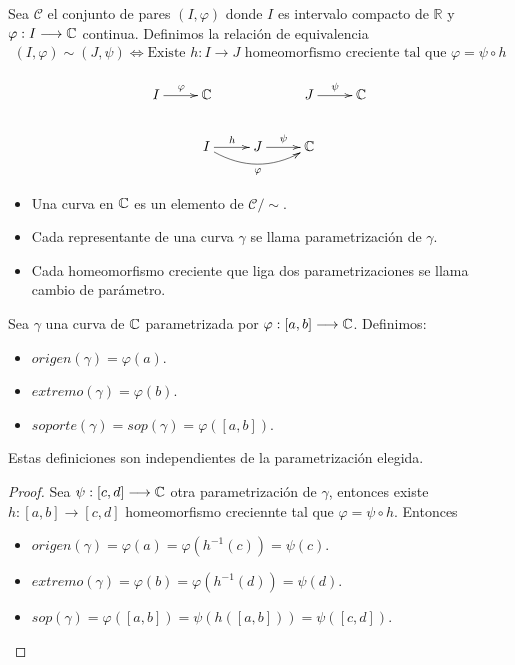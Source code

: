 Sea $\mathcal{C}$ el conjunto de pares $(I,\varphi)$ donde $I$ es intervalo compacto de $\mathbb{R}$ y $\varphi : I \longrightarrow \mathbb{C}$ continua. Definimos la relación de equivalencia
\begin{align*}
    (I,\varphi) \sim (J,\psi) \Longleftrightarrow\text{Existe } h: I \longrightarrow J \text{ homeomorfismo creciente tal que } \varphi = \psi \circ h
\end{align*}

\begin{align*}
    \xymatrix{
    I \ar[r]^{\varphi} & \com                                  &                 & J \ar[r]^{\psi} & \com \\
                       & I \ar[r]^{h} \ar@/_1pc/[rr]_{\varphi} & J \ar[r]^{\psi} & \com
    }
\end{align*}

\begin{defi}
    \begin{itemize}
        \item Una curva en $\mathbb{C}$ es un elemento de $\mathcal{C}/\sim$.
        \item Cada representante de una curva $\gamma$ se llama parametrización de $\gamma$.
        \item Cada homeomorfismo creciente que liga dos parametrizaciones se llama cambio de parámetro.
    \end{itemize}
\end{defi}

\begin{defi}
    Sea $\gamma$ una curva de $\mathbb{C}$ parametrizada por $\varphi : [a,b] \longrightarrow \mathbb{C}$. Definimos:
    \begin{itemize}
        \item $origen(\gamma) = \varphi(a)$.
        \item $extremo(\gamma) = \varphi(b)$.
        \item $soporte(\gamma) = sop(\gamma) = \varphi([a,b])$.
    \end{itemize}
\end{defi}

\begin{obs}
    Estas definiciones son independientes de la parametrización elegida.
    \begin{proof}
        Sea $\psi : [c,d] \longrightarrow \mathbb{C}$ otra parametrización de $\gamma$, entonces existe $h : [a,b] \longrightarrow [c,d]$ homeomorfismo creciennte tal que $\varphi = \psi \circ h$. Entonces
        \begin{itemize}
            \item $origen(\gamma) = \varphi(a) = \varphi(h^{-1}(c)) = \psi(c)$.
            \item $extremo(\gamma) = \varphi(b) = \varphi(h^{-1}(d)) = \psi(d)$.
            \item $sop(\gamma) = \varphi([a,b]) = \psi(h([a,b])) = \psi([c,d])$.
        \end{itemize}
    \end{proof}
\end{obs}

